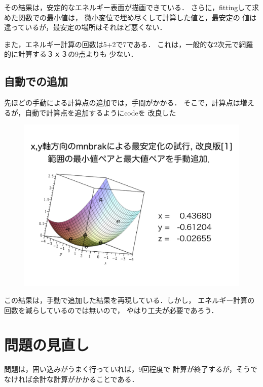 その結果は，安定的なエネルギー表面が描画できている．
さらに，fittingして求めた関数での最小値は，
微小変位で埋め尽くして計算した値と，最安定の
値は違っているが，最安定の場所はそれほど悪くない．

また，エネルギー計算の回数は5+2で7である．
これは，一般的な2次元で網羅的に計算する３ｘ３の9点よりも 少ない．

    \subsection{自動での追加}\label{ux81eaux52d5ux3067ux306eux8ffdux52a0}

先ほどの手動による計算点の追加では，手間がかかる．
そこで，計算点は増えるが，自動で計算点を追加するようにcodeを 改良した

\begin{figure}[H]
\centering
\begin{center}
\includegraphics[width=150mm]{../.././thesis/thesis.009.jpeg}
\end{center}
\caption{{}}

\label{fig:}
\end{figure}

この結果は，手動で追加した結果を再現している．しかし，
エネルギー計算の回数を減らしているのでは無いので，
やはり工夫が必要であろう．

    \section{問題の見直し}\label{ux554fux984cux306eux898bux76f4ux3057}

問題は，囲い込みがうまく行っていれば，9回程度で
計算が終了するが，そうでなければ余計な計算がかかることである．

